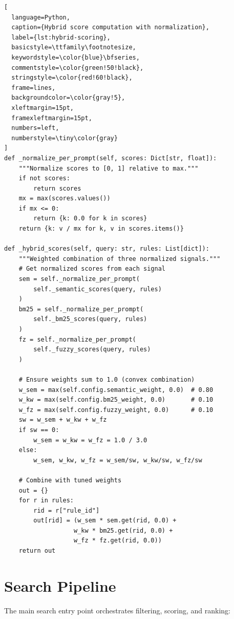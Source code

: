 \begin{lstlisting}[
  language=Python, 
  caption={Hybrid score computation with normalization}, 
  label={lst:hybrid-scoring},
  basicstyle=\ttfamily\footnotesize,
  keywordstyle=\color{blue}\bfseries,
  commentstyle=\color{green!50!black},
  stringstyle=\color{red!60!black},
  frame=lines,
  backgroundcolor=\color{gray!5},
  xleftmargin=15pt,
  framexleftmargin=15pt,
  numbers=left,
  numberstyle=\tiny\color{gray}
]
def _normalize_per_prompt(self, scores: Dict[str, float]):
    """Normalize scores to [0, 1] relative to max."""
    if not scores:
        return scores
    mx = max(scores.values())
    if mx <= 0:
        return {k: 0.0 for k in scores}
    return {k: v / mx for k, v in scores.items()}

def _hybrid_scores(self, query: str, rules: List[dict]):
    """Weighted combination of three normalized signals."""
    # Get normalized scores from each signal
    sem = self._normalize_per_prompt(
        self._semantic_scores(query, rules)
    )
    bm25 = self._normalize_per_prompt(
        self._bm25_scores(query, rules)
    )
    fz = self._normalize_per_prompt(
        self._fuzzy_scores(query, rules)
    )
    
    # Ensure weights sum to 1.0 (convex combination)
    w_sem = max(self.config.semantic_weight, 0.0)  # 0.80
    w_kw = max(self.config.bm25_weight, 0.0)       # 0.10
    w_fz = max(self.config.fuzzy_weight, 0.0)      # 0.10
    sw = w_sem + w_kw + w_fz
    if sw == 0:
        w_sem = w_kw = w_fz = 1.0 / 3.0
    else:
        w_sem, w_kw, w_fz = w_sem/sw, w_kw/sw, w_fz/sw
    
    # Combine with tuned weights
    out = {}
    for r in rules:
        rid = r["rule_id"]
        out[rid] = (w_sem * sem.get(rid, 0.0) + 
                   w_kw * bm25.get(rid, 0.0) + 
                   w_fz * fz.get(rid, 0.0))
    return out
\end{lstlisting}

\section{Search Pipeline}

The main search entry point orchestrates filtering, scoring, and ranking:

